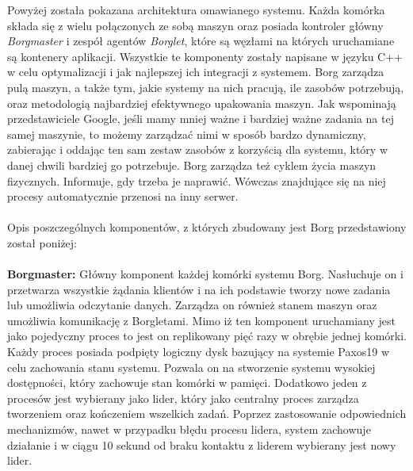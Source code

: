 \documentclass[12pt]{report}
\begin{document}
Powyżej została pokazana architektura omawianego systemu. Każda komórka składa się z wielu połączonych ze sobą maszyn oraz posiada kontroler główny {\it Borgmaster} i zespół agentów {\it Borglet}, które są węzłami na których uruchamiane są kontenery aplikacji. Wszystkie te komponenty zostały napisane w języku C++ w celu optymalizacji i jak najlepszej ich integracji z systemem. Borg zarządza pulą maszyn, a także tym, jakie systemy na nich pracują, ile zasobów potrzebują, oraz metodologią najbardziej efektywnego upakowania maszyn. Jak wspominają przedstawiciele Google, jeśli mamy mniej ważne i bardziej ważne zadania na tej samej maszynie, to możemy zarządzać nimi w sposób bardzo dynamiczny, zabierając i oddając ten sam zestaw zasobów z korzyścią dla systemu, który w danej chwili bardziej go potrzebuje. Borg zarządza też cyklem życia maszyn fizycznych. Informuje, gdy trzeba je naprawić. Wówczas znajdujące się na niej procesy automatycznie przenosi na inny serwer. %
\\ \\
Opis poszczególnych komponentów, z których zbudowany jest Borg przedstawiony został poniżej: \\ \\
{\bf Borgmaster:} Główny komponent każdej komórki systemu Borg. Nasłuchuje on i przetwarza wszystkie żądania klientów i na ich podstawie tworzy nowe zadania lub umożliwia odczytanie danych. Zarządza on również stanem maszyn oraz umożliwia komunikację z Borgletami. Mimo iż ten komponent uruchamiany jest jako pojedyczny proces to jest on replikowany pięć razy w obrębie jednej komórki. Każdy proces posiada podpięty logiczny dysk  bazujący na systemie Paxos19 w celu zachowania stanu systemu. Pozwala on na stworzenie systemu wysokiej dostępności, który zachowuje stan komórki w pamięci. Dodatkowo jeden z procesów jest wybierany jako lider, który jako centralny proces zarządza tworzeniem oraz kończeniem wszelkich zadań. Poprzez zastosowanie odpowiednich mechanizmów, nawet w przypadku błędu procesu lidera, system zachowuje działanie i w ciągu 10 sekund od braku kontaktu z liderem wybierany jest nowy lider. \\ \\
\end{document}
